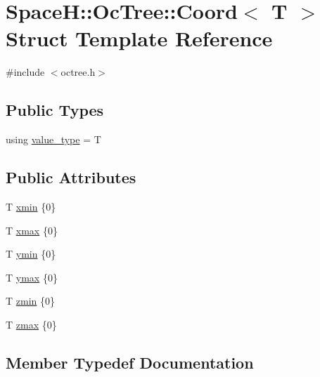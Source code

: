 \hypertarget{struct_space_h_1_1_oc_tree_1_1_coord}{}\section{SpaceH\+:\+:Oc\+Tree\+:\+:Coord$<$ T $>$ Struct Template Reference}
\label{struct_space_h_1_1_oc_tree_1_1_coord}


{\ttfamily \#include $<$octree.\+h$>$}

\subsection*{Public Types}
\begin{DoxyCompactItemize}
\item 
using \mbox{\hyperlink{struct_space_h_1_1_oc_tree_1_1_coord_a7d0ab8b11125aa7214690a891c682645}{value\+\_\+type}} = T
\end{DoxyCompactItemize}
\subsection*{Public Attributes}
\begin{DoxyCompactItemize}
\item 
T \mbox{\hyperlink{struct_space_h_1_1_oc_tree_1_1_coord_acaf50e31eeb18f518b0f3d8ea06c69ac}{xmin}} \{0\}
\item 
T \mbox{\hyperlink{struct_space_h_1_1_oc_tree_1_1_coord_a4cedb350f1b5cee24f8fbb435af7b2d0}{xmax}} \{0\}
\item 
T \mbox{\hyperlink{struct_space_h_1_1_oc_tree_1_1_coord_a094b49bff80734585def902f87973f15}{ymin}} \{0\}
\item 
T \mbox{\hyperlink{struct_space_h_1_1_oc_tree_1_1_coord_ae4fbed83cac15bf8aeeb4a54f21ef829}{ymax}} \{0\}
\item 
T \mbox{\hyperlink{struct_space_h_1_1_oc_tree_1_1_coord_a62fc99017cd4495c3e93f779002870e9}{zmin}} \{0\}
\item 
T \mbox{\hyperlink{struct_space_h_1_1_oc_tree_1_1_coord_aeb57e74e4175c2973f3bc5cc0b0cb120}{zmax}} \{0\}
\end{DoxyCompactItemize}


\subsection{Member Typedef Documentation}
\mbox{\label{struct_space_h_1_1_oc_tree_1_1_coord_a7d0ab8b11125aa7214690a891c682645}} 
